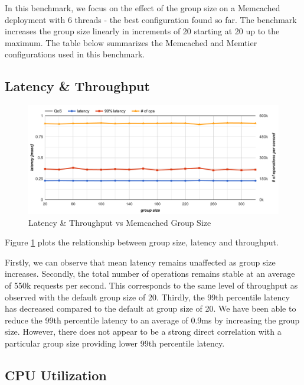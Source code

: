 In this benchmark, we focus on the effect of the group size on a Memcached deployment with 6 threads - the best configuration found so far. The benchmark increases the group size linearly in increments of 20 starting at 20 up to the maximum. The table below summarizes the Memcached and Memtier configurations used in this benchmark.




\subsection{Latency \& Throughput}

\begin{figure}[h]
    \includegraphics[width=\textwidth]{./res2/m_group_size_latency.png}
    \caption{Latency \& Throughput vs Memcached Group Size }
    \label{fig:m_group_size_latency}
\end{figure}

Figure \ref{fig:m_group_size_latency} plots the relationship between group size, latency and throughput.

Firstly, we can observe that mean latency remains unaffected as group size increases.
Secondly, the total number of operations remains stable at an average of 550k requests per second. This corresponds to the same level of throughput as observed with the default group size of 20.
Thirdly, the 99th percentile latency has decreased compared to the default at group size of 20. We have been able to reduce the 99th percentile latency to an average of 0.9ms by increasing the group size. However, there does not appear to be a strong direct correlation with a particular group size providing lower 99th percentile latency.

\subsection{CPU Utilization}

